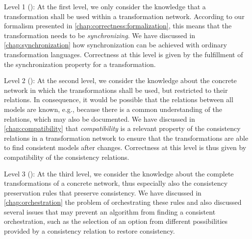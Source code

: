 
\begin{properdescription}
\item[Level 1 (\emph{\LevelTransformation}):] 
At the first level, we only consider the knowledge that a transformation shall be used within a transformation network.
According to our formalism presented in \autoref{chap:correctness:formalization}, this means that the transformation needs to be \emph{synchronizing}.
We have discussed in \autoref{chap:synchronization} how synchronization can be achieved with ordinary transformation languages.
Correctness at this level is given by the fulfillment of the synchronization property for a transformation.

\item[Level 2 (\emph{\LevelNetworkRelation}):] 
At the second level, we consider the knowledge about the concrete network in which the transformations shall be used, but restricted to their relations.
In consequence, it would be possible that the relations between all models are known, e.g., because there is a common understanding of the relations, which may also be documented.
We have discussed in \autoref{chap:compatibility} that \emph{compatibility} is a relevant property of the consistency relations in a transformation network to ensure that the transformations are able to find consistent models after changes.
Correctness at this level is thus given by compatibility of the consistency relations.

\item[Level 3 (\emph{\LevelNetworkRule}):] 
At the third level, we consider the knowledge about the complete transformations of a concrete network, thus especially also the consistency preservation rules that preserve consistency.
We have discussed in \autoref{chap:orchestration} the problem of orchestrating these rules and also discussed several issues that may prevent an algorithm from finding a consistent orchestration, such as the selection of an option from different possibilities provided by a consistency relation to restore consistency.

\end{properdescription}

